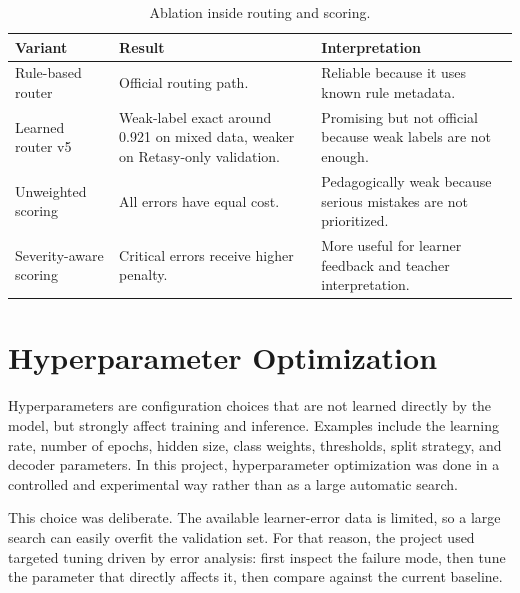 \begin{table}[H]
\centering
\small
\begin{tabularx}{\textwidth}{p{} p{} X}
\toprule
\textbf{Variant} & \textbf{Result} & \textbf{Interpretation} \\
\midrule
Rule-based router &
Official routing path. &
Reliable because it uses known rule metadata. \\
\midrule
Learned router v5 &
Weak-label exact around 0.921 on mixed data, weaker on Retasy-only validation. &
Promising but not official because weak labels are not enough. \\
\midrule
Unweighted scoring &
All errors have equal cost. &
Pedagogically weak because serious mistakes are not prioritized. \\
\midrule
Severity-aware scoring &
Critical errors receive higher penalty. &
More useful for learner feedback and teacher interpretation. \\
\bottomrule
\end{tabularx}
\caption{Ablation inside routing and scoring.}
\label{tab:routing_scoring_ablation}
\end{table}

\section{Hyperparameter Optimization}

Hyperparameters are configuration choices that are not learned directly by the
model, but strongly affect training and inference. Examples include the learning
rate, number of epochs, hidden size, class weights, thresholds, split strategy,
and decoder parameters. In this project, hyperparameter optimization was done in
a controlled and experimental way rather than as a large automatic search.

This choice was deliberate. The available learner-error data is limited, so a
large search can easily overfit the validation set. For that reason, the project
used targeted tuning driven by error analysis: first inspect the failure mode,
then tune the parameter that directly affects it, then compare against the
current baseline.

